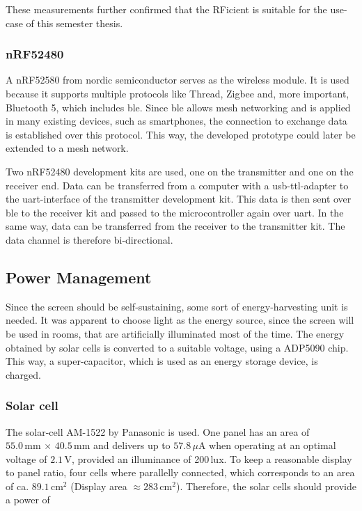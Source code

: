 These measurements further confirmed that the RFicient is suitable for the use-case of this semester thesis.

\subsubsection{nRF52480}
A nRF52580 from nordic semiconductor serves as the wireless module.
It is used because it supports multiple protocols like Thread, Zigbee and, more important, Bluetooth 5, which includes \acf{ble}\cite{nrfpb}.
Since \acs{ble} allows mesh networking and is applied in many existing devices, such as smartphones, the connection to exchange data is established over this protocol.
This way, the developed prototype could later be extended to a mesh network.

Two nRF52480 development kits are used, one on the transmitter and one on the receiver end.
Data can be transferred from a computer with a \acs{usb}-\acs{ttl}-adapter to the \acs{uart}-interface of the transmitter development kit.
This data is then sent over \acs{ble} to the receiver kit and passed to the microcontroller again over \acs{uart}.
In the same way, data can be transferred from the receiver to the transmitter kit.
The data channel is therefore bi-directional. 

\subsection{Power Management}
Since the screen should be self-sustaining, some sort of energy-harvesting unit is needed.
It was apparent to choose light as the energy source, since the screen will be used in rooms, that are artificially illuminated most of the time.
The energy  obtained by solar cells is converted to a suitable voltage, using a ADP5090 chip.
This way, a super-capacitor, which is used as an energy storage device, is charged.

\subsubsection{Solar cell}
The solar-cell AM-1522 by Panasonic is used.
One panel has an area of $55.0\,\text{mm}\,\times\,40.5\,\text{mm}$ and delivers up to $57.8\, \mu\text{A}$ when operating at an optimal voltage of $2.1\,\text{V}$, provided an illuminance of 200\,lux.
To keep a reasonable display to panel ratio, four cells where parallelly connected, which corresponds to an area of ca. $89.1\,\text{cm}^2$ (Display area $\approx 283\,\text{cm}^2$). Therefore, the solar cells should provide a power of

